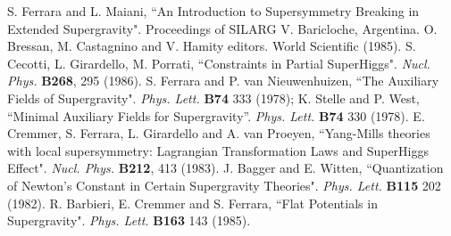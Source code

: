 \documentclass[a4paper,12pt]{article}
\begin{document}
\begin{thebibliography}{99}
S. Ferrara and L. Maiani, ``An Introduction to Supersymmetry Breaking in Extended Supergravity".
Proceedings of SILARG V. Baricloche, Argentina. O. Bressan, M.
Castagnino and V.
Hamity editors. World Scientific (1985).
 S. Cecotti, L. Girardello, M. Porrati, ``Constraints in Partial SuperHiggs". {\it
Nucl.
Phys. } {\bf B268}, 295
(1986).
 S. Ferrara and P. van Nieuwenhuizen, ``The Auxiliary Fields of Supergravity". {\it
Phys.
Lett. } {\bf B74} 333 (1978);
K. Stelle and P. West, ``Minimal Auxiliary Fields for Supergravity''. {\it Phys. Lett.} {\bf B74} 330 (1978).
 E. Cremmer, S. Ferrara, L. Girardello and A. van Proeyen, ``Yang-Mills theories with
local
supersymmetry: Lagrangian Transformation Laws and SuperHiggs Effect". {\it  Nucl. Phys. } {\bf B212}, 413
(1983).
 J. Bagger and E. Witten, ``Quantization of Newton's Constant in Certain Supergravity
Theories". {\it Phys. Lett.} {\bf B115} 202 (1982).
 R. Barbieri, E. Cremmer and S. Ferrara, ``Flat Potentials in \coordHE{} Supergravity".
{\it Phys. Lett.} {\bf B163} 143 (1985).
\end{thebibliography}
\end{document}
